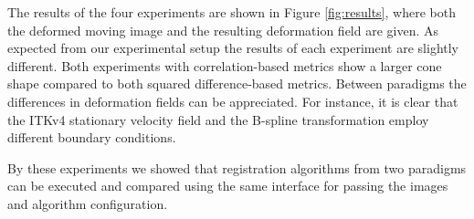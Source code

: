 The results of the four experiments are shown in Figure
\ref{fig:results}, where both the deformed moving image and the
resulting deformation field are given. As expected from our
experimental setup the results of each experiment are slightly
different. Both experiments with correlation-based metrics show a
larger cone shape compared to both squared difference-based metrics. 
Between paradigms the differences in
deformation fields can be appreciated. 
For instance, it is clear that the ITKv4 stationary velocity field and the \elastix{} B-spline transformation employ different boundary conditions.

By these experiments we showed that registration algorithms from two
paradigms can be executed and compared using the same interface for passing the
images and algorithm configuration.

